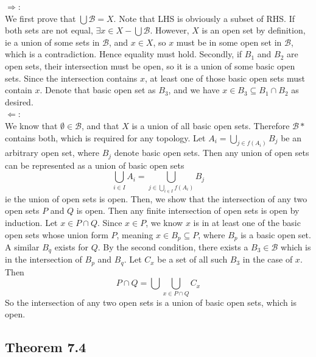 \begin{solution}
 $\Rightarrow$: \\
 We first prove that $\bigcup \mathcal{B} = X$. Note that LHS is obviously a subset of RHS. If both sets are not equal, $\exists x \in X - \bigcup \mathcal{B}$. However, $X$ is an open set by definition, ie a union of some sets in $\mathcal{B}$, and $x \in X$, so $x$ must be in some open set in $\mathcal{B}$, which is a contradiction. Hence equality must hold. Secondly, if $B_1$ and $B_2$ are open sets, their intersection must be open, so it is a union of some basic open sets. Since the intersection contains $x$, at least one of those basic open sets must contain $x$. Denote that basic open set as $B_3$, and we have $x \in B_3 \subseteq B_1 \cap B_2$ as desired. \\
 $\Leftarrow$: \\
 We know that $\emptyset \in \mathcal{B}$, and that $X$ is a union of all basic open sets. Therefore $\mathcal{B}*$ contains both, which is required for any topology. Let $A_i = \bigcup_{j \in f(A_i)} B_j$ be an arbitrary open set, where $B_j$ denote basic open sets. Then any union of open sets can be represented as a union of basic open sets $$\bigcup_{i \in I} A_i = \bigcup_{j \in \bigcup_{i \in I} f(A_i)} B_j$$ ie the union of open sets is open. Then, we show that the intersection of any two open sets $P$ and $Q$ is open. Then any finite intersection of open sets is open by induction. Let $x \in P \cap Q$. Since $x \in P$, we know $x$ is in at least one of the basic open sets whose union form $P$, meaning $x \in B_p \subseteq P$, where $B_p$ is a basic open set. A similar $B_q$ exists for $Q$. By the second condition, there exists a $B_3 \in \mathcal{B}$ which is in the intersection of $B_p$ and $B_q$. Let $C_x$ be a set of all such $B_3$ in the case of $x$. Then
 $$P \cap Q = \bigcup \bigcup_{x \in P \cap Q} C_x$$
 So the intersection of any two open sets is a union of basic open sets, which is open.
 \end{solution}

\subsection{Theorem 7.4}\label{thm4.7.4}
\setcounter{question}{0}


